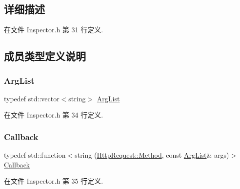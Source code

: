 \subsection{详细描述}


在文件 Inspector.\+h 第 31 行定义.



\subsection{成员类型定义说明}
\mbox{\label{classmuduo_1_1net_1_1Inspector_aa22799cd3b4f56688d431d68c2d014a0}} 
\subsubsection{\texorpdfstring{Arg\+List}{ArgList}}
{\footnotesize\ttfamily typedef std\+::vector$<$string$>$ \hyperlink{classmuduo_1_1net_1_1Inspector_aa22799cd3b4f56688d431d68c2d014a0}{Arg\+List}}



在文件 Inspector.\+h 第 34 行定义.

\mbox{\label{classmuduo_1_1net_1_1Inspector_a9b3d030deba315670a7da29b78586217}} 
\subsubsection{\texorpdfstring{Callback}{Callback}}
{\footnotesize\ttfamily typedef std\+::function$<$string (\hyperlink{classmuduo_1_1net_1_1HttpRequest_a2a3c0067e44c5ef3210a256d06c16b0f}{Http\+Request\+::\+Method}, const \hyperlink{classmuduo_1_1net_1_1Inspector_aa22799cd3b4f56688d431d68c2d014a0}{Arg\+List}\& args)$>$ \hyperlink{classmuduo_1_1net_1_1Inspector_a9b3d030deba315670a7da29b78586217}{Callback}}



在文件 Inspector.\+h 第 35 行定义.

\mbox{\label{classmuduo_1_1net_1_1Inspector_a00ae736a47d9b5825c815a1c8aeeaeab}} 
